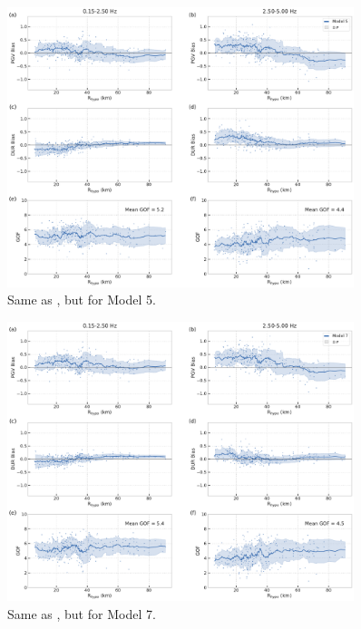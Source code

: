 \begin{figure}[!ht]
  \centering
  \includegraphics[width=0.9\textwidth,height=0.9\textheight,keepaspectratio]{figures/figure_highf_S15.pdf}
  \caption{Same as , but for Model 5.
  }
\label{fig:highf-A15}
\end{figure}
\clearpage


\begin{figure}[!ht]
  \centering
  \includegraphics[width=0.9\textwidth,height=0.9\textheight,keepaspectratio]{figures/figure_highf_S17.pdf}
  \caption{Same as , but for Model 7.
  }
\label{fig:highf-A17}
\end{figure}
\clearpage


